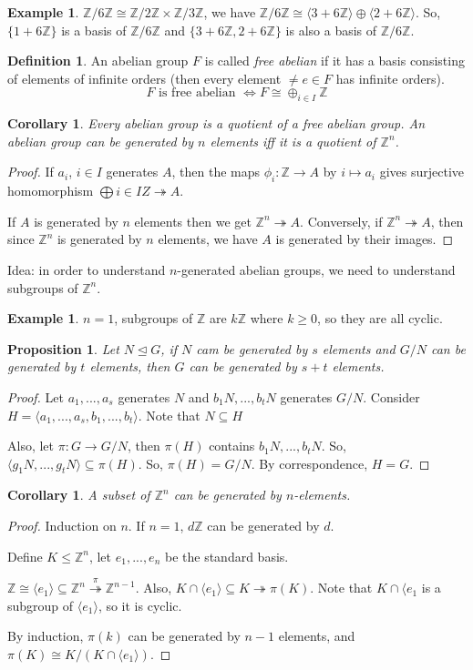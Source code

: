 \documentclass{amsart}
\newtheorem{prop}[thm]{Proposition}
\newtheorem{cor}[thm]{Corollary}
\theoremstyle{definition}
\newtheorem{definition}[thm]{Definition}
\newtheorem{example}[thm]{Example}
\newcommand{\Z}{\mathbb Z}
\begin{document}
\begin{example}
$\Z/6\Z\cong \Z/2\Z\times\Z/3\Z$, we have $\Z/6\Z \cong\langle3+6\Z\rangle\oplus \langle 2+6\Z\rangle$. So, $\{1+6\Z\}$ is a basis of $\Z/6\Z$ and $\{3+6\Z,2+6\Z\}$ is also a basis of $\Z/6\Z$.	
\end{example}
\begin{definition}
An abelian group $F$ is called \emph{free abelian} if it has a basis consisting of elements of infinite orders (then every element $\not= e\in F$ has infinite orders).
$$F\text{ is free abelian }\iff F\cong \oplus_{i\in I}\Z$$	
\end{definition}
\begin{cor}
	Every abelian group is a quotient of a free abelian group. An abelian group can be generated by $n$ elements iff it is a quotient of $\Z^n$.
\end{cor}
\begin{proof}
If $a_i$, $i\in I$ generates $A$, then the maps $\phi_i:\Z\to A$ by $i\mapsto a_i$ gives surjective homomorphism $\bigoplus\limits{i\in I}Z\twoheadrightarrow A$.	

If $A$ is generated by $n$ elements then we get $\Z^n\twoheadrightarrow A$. Conversely, if $\Z^n\twoheadrightarrow A$, then since $\Z^n$ is generated by $n$ elements, we have $A$ is generated by their images. 
\end{proof}
Idea: in order to understand $n$-generated abelian groups, we need to understand subgroups of $\Z^n$.
\begin{example}
	$n=1$, subgroups of $\Z$ are $k\Z$ where $k\geq 0$, so they are all cyclic.
\end{example}
\begin{prop}
Let $N\unlhd G$, if $N$ cam be generated by $s$ elements and $G/N$ can be generated by $t$ elements, then $G$ can be generated by $s+t$ elements.	
\end{prop}
\begin{proof}
Let $a_1,...,a_s$ generates $N$ and $b_1N,...,b_tN$ generates $G/N$. Consider $H=\langle a_1,...,a_s,b_1,...,b_t\rangle$. Note that $N\subseteq H$

Also, let $\pi:G\to G/N$, then $\pi(H)$ contains $b_1N,...,b_tN$. So, $\langle g_1N,...,g_tN\rangle\subseteq \pi(H)$. So, $\pi(H)=G/N$. By correspondence, $H=G$. 	
\end{proof}
\begin{cor}
A subset of $\Z^n$ can be generated by $n$-elements.	
\end{cor}
\begin{proof}
Induction on $n$. If $n=1$, $d\Z$ can be generated by $d$.

Define $K\leq \Z^n$, let $e_1,...,e_n$ be the standard basis.

$\Z\cong \langle e_1\rangle\subseteq \Z^n\overset{\pi}\twoheadrightarrow\Z^{n-1}$. Also, $K\cap \langle e_1\rangle \subseteq K\twoheadrightarrow\pi(K)$. Note that $K\cap \langle e_1 $ is a subgroup of $\langle e_1\rangle$, so it is cyclic. 

By induction, $\pi(k)$ can be generated by $n-1$ elements, and $\pi(K)\cong K/(K\cap\langle e_1\rangle)$. 	
\end{proof}
\end{document}
